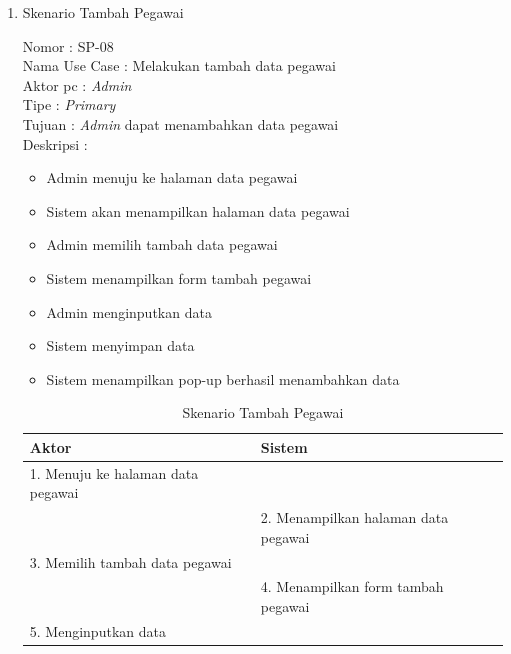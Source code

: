 \begin{enumerate}
\begin{table}
\begin{tabular}{ | p{60mm} | p{68mm} |}
		
	\end{tabular}
\end{table}

\item Skenario Tambah Pegawai

Nomor \kern 3.6pc : SP-08 \\
Nama Use Case : Melakukan tambah data pegawai \\
Aktor  pc : \textit{Admin} \\
Tipe \kern 4.6pc : \textit{Primary} \\
Tujuan \kern 3.6pc : \textit{Admin} dapat menambahkan data pegawai \\
Deskripsi \kern 2.5pc : 

\begin{itemize}
	\item Admin menuju ke halaman data pegawai
	\item Sistem akan menampilkan halaman data pegawai
	\item Admin memilih tambah data pegawai
	\item Sistem menampilkan form tambah pegawai
	\item Admin menginputkan data
	\item Sistem menyimpan data
	\item Sistem menampilkan pop-up berhasil menambahkan data
	
\end{itemize}

\begin{table}
	\caption{Skenario Tambah Pegawai}
	\centering
	\begin{tabular}{ | l | p{66.5mm} |}
		\hline 
		\textbf{Aktor} & \textbf{Sistem} \\
		\hline
		
		1.	Menuju ke halaman data pegawai &  \\
		
		\hline
		
		&  2.	Menampilkan halaman data pegawai \\
		
		\hline
		
		3. Memilih tambah data pegawai & \\
		
		\hline
		
		& 4.	Menampilkan form tambah pegawai \\
		
		\hline
		
		5. Menginputkan data & \\
		\hline
		

\end{tabular}
\end{table}
\end{enumerate}
